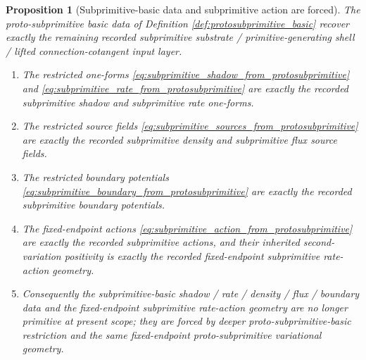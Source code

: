 \documentclass[11pt]{article}
\newtheorem{proposition}{Proposition}
\begin{document}
\begin{proposition}[Subprimitive-basic data and subprimitive action are forced]
\label{prop:subprimitive_basic_forced}
The proto-subprimitive basic data of Definition \ref{def:protosubprimitive_basic} recover exactly the remaining recorded subprimitive substrate / primitive-generating shell / lifted connection-cotangent input layer.
\begin{enumerate}
    \item The restricted one-forms \eqref{eq:subprimitive_shadow_from_protosubprimitive} and \eqref{eq:subprimitive_rate_from_protosubprimitive} are exactly the recorded subprimitive shadow and subprimitive rate one-forms.
    \item The restricted source fields \eqref{eq:subprimitive_sources_from_protosubprimitive} are exactly the recorded subprimitive density and subprimitive flux source fields.
    \item The restricted boundary potentials \eqref{eq:subprimitive_boundary_from_protosubprimitive} are exactly the recorded subprimitive boundary potentials.
    \item The fixed-endpoint actions \eqref{eq:subprimitive_action_from_protosubprimitive} are exactly the recorded subprimitive actions, and their inherited second-variation positivity is exactly the recorded fixed-endpoint subprimitive rate-action geometry.
    \item Consequently the subprimitive-basic shadow / rate / density / flux / boundary data and the fixed-endpoint subprimitive rate-action geometry are no longer primitive at present scope; they are forced by deeper proto-subprimitive-basic restriction and the same fixed-endpoint proto-subprimitive variational geometry.
\end{enumerate}
\end{proposition}
\end{document}
